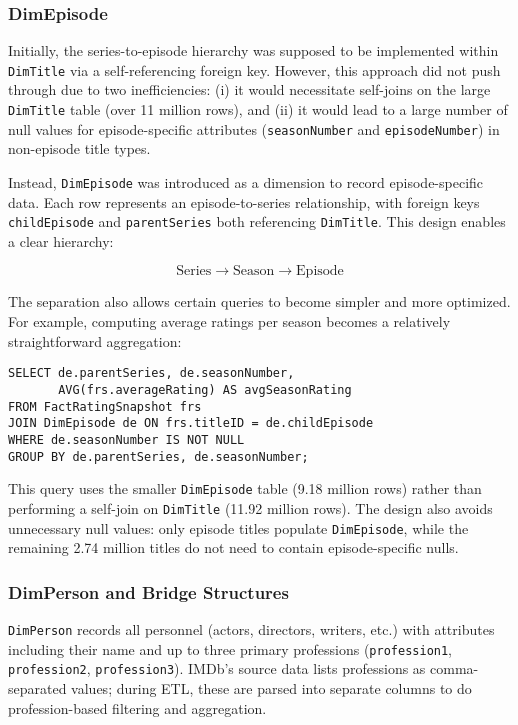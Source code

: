 \subsubsection{DimEpisode}

Initially, the series-to-episode hierarchy was supposed to be implemented within \verb|DimTitle| via a self-referencing foreign key. However, this approach did not push through due to two inefficiencies: (i) it would necessitate self-joins on the large \verb|DimTitle| table (over 11 million rows), and (ii) it would lead to a large number of null values for episode-specific attributes (\verb|seasonNumber| and \verb|episodeNumber|) in non-episode title types.

Instead, \verb|DimEpisode| was introduced as a dimension to record episode-specific data. Each row represents an episode-to-series relationship, with foreign keys \verb|childEpisode| and \verb|parentSeries| both referencing \verb|DimTitle|. This design enables a clear hierarchy:

\[
\text{Series} \rightarrow \text{Season} \rightarrow \text{Episode}
\]

The separation also allows certain queries to become simpler and more optimized. For example, computing average ratings per season becomes a relatively straightforward aggregation:

\begin{verbatim}
SELECT de.parentSeries, de.seasonNumber, 
       AVG(frs.averageRating) AS avgSeasonRating
FROM FactRatingSnapshot frs
JOIN DimEpisode de ON frs.titleID = de.childEpisode
WHERE de.seasonNumber IS NOT NULL
GROUP BY de.parentSeries, de.seasonNumber;
\end{verbatim}

This query uses the smaller \verb|DimEpisode| table (9.18 million rows) rather than performing a self-join on \verb|DimTitle| (11.92 million rows). The design also avoids unnecessary null values: only episode titles populate \verb|DimEpisode|, while the remaining 2.74 million titles do not need to contain episode-specific nulls.

\subsubsection{DimPerson and Bridge Structures}

\verb|DimPerson| records all personnel (actors, directors, writers, etc.) with attributes including their name and up to three primary professions (\verb|profession1|, \verb|profession2|, \verb|profession3|). IMDb's source data lists professions as comma-separated values; during ETL, these are parsed into separate columns to do profession-based filtering and aggregation.

